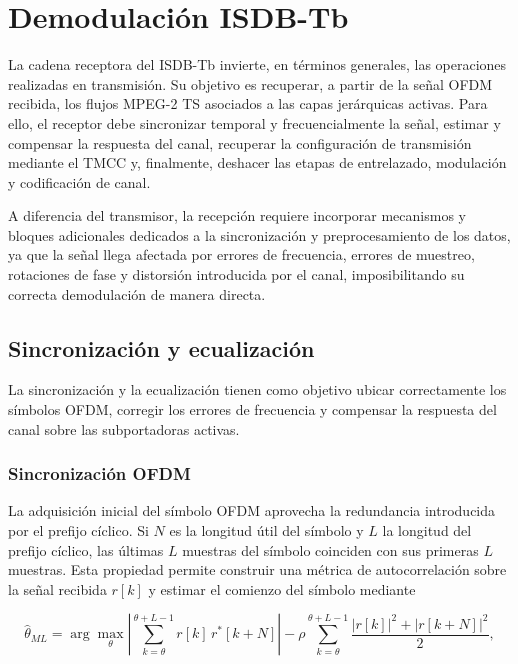 
\chapter{Demodulación ISDB-Tb}
\label{chap:isdbtb_rx}


La cadena receptora del ISDB-Tb invierte, en términos generales, las operaciones realizadas en transmisión. Su objetivo es recuperar, a partir de la señal OFDM recibida, los flujos MPEG-2 TS asociados a las capas jerárquicas activas. Para ello, el receptor debe sincronizar temporal y frecuencialmente la señal, estimar y compensar la respuesta del canal, recuperar la configuración de transmisión mediante el TMCC y, finalmente, deshacer las etapas de entrelazado, modulación y codificación de canal.

A diferencia del transmisor, la recepción requiere incorporar mecanismos y bloques adicionales dedicados a la sincronización y preprocesamiento de los datos, ya que la señal llega afectada por errores de frecuencia, errores de muestreo, rotaciones de fase y distorsión introducida por el canal, imposibilitando su correcta demodulación de manera directa.



\section{Sincronización y ecualización}
\label{sec:isdbtb_sync_eq}

La sincronización y la ecualización tienen como objetivo ubicar correctamente los símbolos OFDM, corregir los errores de frecuencia y compensar la respuesta del canal sobre las subportadoras activas.

\subsection{Sincronización OFDM}

La adquisición inicial del símbolo OFDM aprovecha la redundancia introducida por el prefijo cíclico. Si $N$ es la longitud útil del símbolo y $L$ la longitud del prefijo cíclico, las últimas $L$ muestras del símbolo coinciden con sus primeras $L$ muestras. Esta propiedad permite construir una métrica de autocorrelación sobre la señal recibida $r[k]$ y estimar el comienzo del símbolo mediante

\begin{equation}
\hat{\theta}_{ML}
=
\arg \max_{\theta}
\left|
\sum_{k=\theta}^{\theta+L-1} r[k]\,r^{*}[k+N]
\right|
-
\rho
\sum_{k=\theta}^{\theta+L-1}
\frac{|r[k]|^2 + |r[k+N]|^2}{2},
\end{equation}

